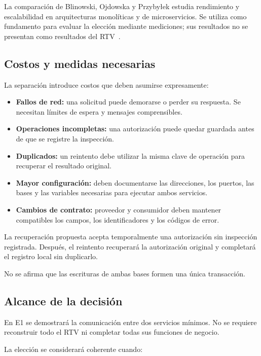 \documentclass[11pt,a4paper]{article}
\begin{document}
	La comparación de Blinowski, Ojdowska y Przybyłek estudia rendimiento y escalabilidad en arquitecturas monolíticas y de microservicios. Se utiliza como fundamento para evaluar la elección mediante mediciones; sus resultados no se presentan como resultados del RTV~\cite{blinowski2022monolithic}.
	
	\subsection{Costos y medidas necesarias}
	
	La separación introduce costos que deben asumirse expresamente:
	
	\begin{itemize}[nosep]
		\item \textbf{Fallos de red:} una solicitud puede demorarse o perder su respuesta. Se necesitan límites de espera y mensajes comprensibles.
		\item \textbf{Operaciones incompletas:} una autorización puede quedar guardada antes de que se registre la inspección.
		\item \textbf{Duplicados:} un reintento debe utilizar la misma clave de operación para recuperar el resultado original.
		\item \textbf{Mayor configuración:} deben documentarse las direcciones, los puertos, las bases y las variables necesarias para ejecutar ambos servicios.
		\item \textbf{Cambios de contrato:} proveedor y consumidor deben mantener compatibles los campos, los identificadores y los códigos de error.
	\end{itemize}
	
	La recuperación propuesta acepta temporalmente una autorización sin inspección registrada. Después, el reintento recuperará la autorización original y completará el registro local sin duplicarlo.
	
	No se afirma que las escrituras de ambas bases formen una única transacción.
	
	\subsection{Alcance de la decisión}
	
	En E1 se demostrará la comunicación entre dos servicios mínimos. No se requiere reconstruir todo el RTV ni completar todas sus funciones de negocio.
	
	La elección se considerará coherente cuando:
	
\end{document}
